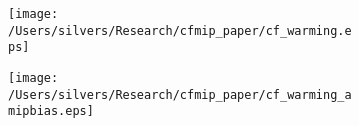 \documentclass[varwidth, border=10pt]{standalone}
\begin{document}
\begin{figure}
  \centering
  \begin{subfigure}{0.48\textwidth}
    \texttt{[image: /Users/silvers/Research/cfmip\_paper/cf\_warming.eps]}
\end{subfigure}
\begin{subfigure}{0.48\textwidth}
  \texttt{[image: /Users/silvers/Research/cfmip\_paper/cf\_warming\_amipbias.eps]}
\end{subfigure}
\end{figure}
\end{document}

